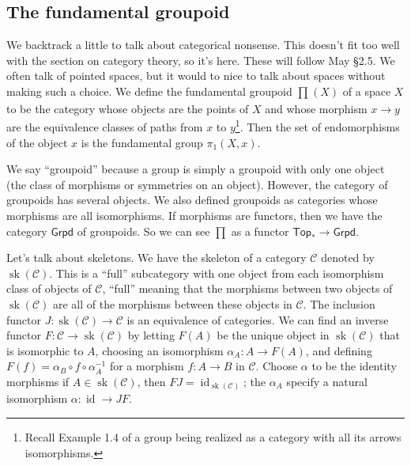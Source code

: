 \subsection{The fundamental groupoid}
We backtrack a little to talk about categorical nonsense. This doesn't fit too well with the section on category theory, so it's here. These will follow May \S 2.5.
\orbreak
We often talk of pointed spaces, but it would to nice to talk about spaces without making such a choice. We define the fundamental groupoid $\prod_{}^{} (X) $ of a space $X$ to be the category whose objects are the points of $X$ and whose morphism $x \to y$ are the equivalence classes of paths from $x$ to $y$\footnote{Recall Example 1.4 of a group being realized as a category with all its arrows isomorphisms.}. Then the set of endomorphisms of the object $x$ is the fundamental group $\pi_1(X,x)$.

We say ``groupoid'' because a group is simply a groupoid with only one object (the class of morphisms or symmetries on an object). However, the category of groupoids has several objects. We also defined groupoids as categories whose morphisms are all isomorphisms. If morphisms are functors, then we have the category $\mathsf{Grpd} $ of groupoids. So we can see $\prod $ as a functor $\mathsf{Top_*} \to \mathsf{Grpd} $.

Let's talk about skeletons. We have the skeleton of a category $\mathcal{C} $ denoted by $\operatorname{sk}(\mathcal{C}) $. This is a ``full'' subcategory with one object from each isomorphism class of objects of $\mathcal{C} $, ``full'' meaning that the morphisms between two objects of $\operatorname{sk}(\mathcal{C} )$ are all of the morphisms between these objects in $\mathcal{C} $. The inclusion functor $J \colon \operatorname{sk}(\mathcal{C} ) \to \mathcal{C} $ is an equivalence of categories. We can find an inverse functor $F \colon \mathcal{C}  \to \operatorname{sk}(\mathcal{C} )$ by letting $F(A)$ be the unique object in $\operatorname{sk}(\mathcal{C} )$ that is isomorphic to $A$, choosing an isomorphism $\alpha _A \colon A \to F(A)$, and defining $F(f)=\alpha _B \circ f \circ \alpha_A^{-1}$ for a morphism $f \colon  A \to B$ in $\mathcal{C} $. Choose $\alpha $ to be the identity morphisms if $A\in \operatorname{sk}(\mathcal{C} )$, then $FJ=\operatorname{id}_{\operatorname{sk}(\mathcal{C} )}$; the $\alpha _A$ specify a natural isomorphism $\alpha \colon \operatorname{id} \to JF $.

